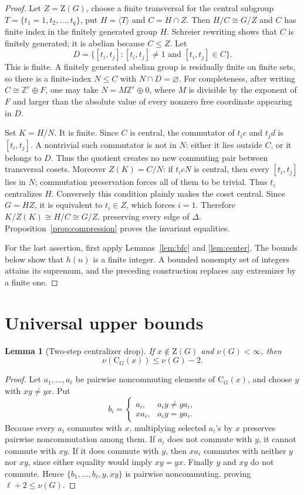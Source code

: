 \documentclass[11pt]{article}
\newtheorem{lemma}[theorem]{Lemma}
\theoremstyle{remark}
\newcommand{\nuG}{\nu}
\newcommand{\Z}{\mathrm Z}
\newcommand{\CG}{\mathrm C}
\begin{document}
\begin{proof}
Let $Z=\Z(G)$, choose a finite transversal for the central subgroup
$T=\{t_1=1,t_2,\dots,t_q\}$, put $H=\langle T\rangle$ and $C=H\cap Z$.
Then $H/C\cong G/Z$ and $C$ has finite index in the finitely generated group
$H$.  Schreier rewriting shows that $C$ is finitely generated; it is
abelian because $C\le Z$.  Let
\[
 D=\{[t_i,t_j]:[t_i,t_j]\ne1\text{ and }[t_i,t_j]\in C\}.
\]
This is finite.  A finitely generated abelian group is residually finite on
finite sets, so there is a finite-index $N\le C$ with $N\cap D=\varnothing$.
For completeness, after writing $C\cong\mathbb Z^r\oplus F$, one may take
$N=M\mathbb Z^r\oplus0$, where $M$ is divisible by the exponent of $F$ and
larger than the absolute value of every nonzero free coordinate appearing
in $D$.

Set $K=H/N$.  It is finite.  Since $C$ is central, the commutator of
$t_ic$ and $t_jd$ is $[t_i,t_j]$.  A nontrivial such commutator is not in
$N$: either it lies outside $C$, or it belongs to $D$.  Thus the quotient
creates no new commuting pair between transversal cosets.  Moreover
$Z(K)=C/N$: if $t_icN$ is central, then every $[t_i,t_j]$ lies in $N$;
commutation preservation forces all of them to be trivial. Thus $t_i$
centralizes $H$. Conversely this condition plainly makes the coset central.
Since $G=HZ$, it is equivalent to $t_i\in Z$, which forces $i=1$.
Therefore $K/Z(K)\cong H/C\cong G/Z$, preserving every edge of $\Delta$.
Proposition~\ref{prop:compression} proves the invariant equalities.

For the last assertion, first apply Lemmas~\ref{lem:bfc} and
\ref{lem:center}.  The bounds below show that $h(n)$ is a finite integer.
A bounded nonempty set of integers attains its supremum, and the preceding
construction replaces any extremizer by a finite one.
\end{proof}

\section{Universal upper bounds}

\begin{lemma}[Two-step centralizer drop]\label{lem:drop}
If $x\notin\Z(G)$ and $\nuG(G)<\infty$, then
\[
 \nuG(\CG_G(x))\le\nuG(G)-2.
\]
\end{lemma}

\begin{proof}
Let $a_1,\dots,a_\ell$ be pairwise noncommuting elements of $\CG_G(x)$,
and choose $y$ with $xy\ne yx$.  Put
\[
 b_i=\begin{cases}a_i,&a_iy\ne ya_i,\\ xa_i,&a_iy=ya_i.\end{cases}
\]
Because every $a_i$ commutes with $x$, multiplying selected $a_i$'s by $x$
preserves pairwise noncommutation among them.  If $a_i$ does not commute with
$y$, it cannot commute with $xy$.  If it does commute with $y$, then $xa_i$
commutes with neither $y$ nor $xy$, since either equality would imply
$xy=yx$.  Finally $y$ and $xy$ do not commute.  Hence
$\{b_1,\dots,b_\ell,y,xy\}$ is pairwise noncommuting, proving
$\ell+2\le\nuG(G)$.
\end{proof}
\end{document}
